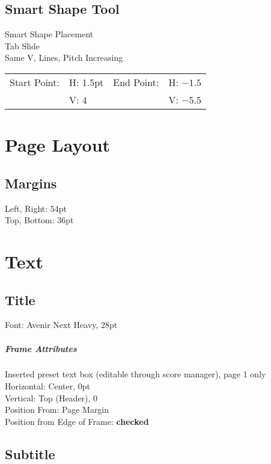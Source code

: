 \documentclass[unicode,hyperfootnotes=false,xetex,colorlinks=true,nofonts,nobib]{tufte-book} %
\begin{document}
\section{Smart Shape Tool}
Smart Shape Placement\\
Tab Slide\\
Same V, Lines, Pitch Increasing\\
\begin{tabular}{l l l l}
Start Point: & H: 1.5pt & End Point: & H: $-1.5$\\
& V: 4 & & V: $-5.5$\\
\end{tabular}
\chapter{Page Layout}
\section{Margins}
Left, Right: 54pt\\
Top, Bottom: 36pt
\chapter{Text}
\section{Title}
Font: Avenir Next Heavy, 28pt

\paragraph{Frame Attributes}
Inserted preset text box (editable through score manager), page 1 only\\
Horizontal: Center, 0pt\\
Vertical: Top (Header), 0\\
Position From: Page Margin\\
Position from Edge of Frame: \textbf{checked}

\section{Subtitle}
\label{sec:subtitle}
\end{document}
